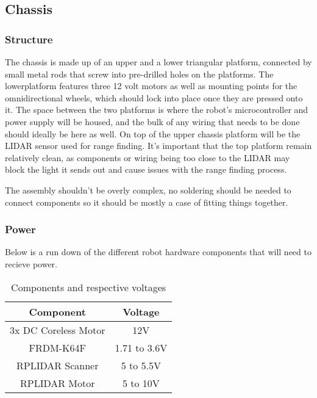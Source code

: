 		\subsection{Chassis}
			\subsubsection{Structure}
			The chassis is made up of an upper and a lower triangular platform, connected by small metal rods that screw into pre-drilled holes on the platforms. The lowerplatform features three 12 volt motors as well as mounting points for the omnidirectional wheels, which should lock into place once they are pressed onto it. %
			The space between the two platforms is where the robot's microcontroller and power supply will be housed, and the bulk of any wiring that needs to be done should ideally be here as well. On top of the upper chassis platform will be the LIDAR sensor used for range finding. It's important that the top platform remain relatively clean, as components or wiring being too close to the LIDAR may block the light it sends out and cause issues with the range finding process.
			
			The assembly shouldn't be overly complex, no soldering should be needed to connect components so it should be mostly a case of fitting things together.
			
			\subsubsection{Power}
			Below is a run down of the different robot hardware components that will need to recieve power.
			
			\begin{table}[h!]
				\centering
				\begin{tabular}{||c c||} 
					\hline
					Component & Voltage \\ [0.5ex] 
					\hline\hline
					3x DC Coreless Motor  & 12V  \\ 
					FRDM-K64F  & 1.71 to 3.6V   \\
					RPLIDAR Scanner  & 5 to 5.5V  \\
					RPLIDAR Motor & 5 to 10V  \\ [1ex] 
					\hline
				\end{tabular}
				\caption{Components and respective voltages}
				\label{table:1}
			\end{table}
			
			
			
